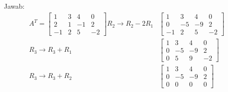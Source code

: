 \documentclass[12pt, a4paper]{scrartcl}
\begin{document}
\begin{enumerate}
\begin{enumerate}
            Jawab:
            \begin{align*}
                A^T=\begin{bmatrix}
                    1&3&4&0\\2&1&-1&2\\-1&2&5&-2
                \end{bmatrix} R_2\to R_2-2R_1 &\begin{bmatrix}
                    1&3&4&0\\0&-5&-9&2\\-1&2&5&-2
                \end{bmatrix} \\R_3\to R_3 + R_1 &\begin{bmatrix}
                    1&3&4&0\\0&-5&-9&2\\0&5&9&-2
                \end{bmatrix} \\R_3\to R_3+R_2 &\begin{bmatrix}
                    1&3&4&0\\0&-5&-9&2\\0&0&0&0
                \end{bmatrix}
            \end{align*}


\end{enumerate}
\end{enumerate}
\end{document}
